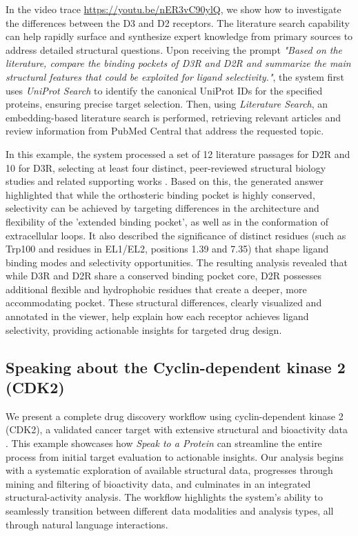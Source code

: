 \documentclass{article}
\begin{document}
In the video trace \url{https://youtu.be/nER3vC90ylQ}, we show how to investigate the differences between the D3 and D2 receptors. The literature search capability can help rapidly surface and synthesize expert knowledge from primary sources to address detailed structural questions.
Upon receiving the prompt \emph{"Based on the literature, compare the binding pockets of D3R and D2R and summarize the main structural features that could be exploited for ligand selectivity."}, the system first uses \emph{UniProt Search} to identify the canonical UniProt IDs for the specified proteins, ensuring precise target selection. Then, using \emph{Literature Search}, an embedding-based literature search is performed, retrieving relevant articles and review information from PubMed Central that address the requested topic. 

In this example, the system processed a set of 12 literature passages for D2R and 10 for D3R, selecting at least four distinct, peer-reviewed structural biology studies and related supporting works \citep{Wang2018,Chien2010,Yin2020,Fan2020}. Based on this, the generated answer highlighted that while the orthosteric binding pocket is highly conserved, selectivity can be achieved by targeting differences in the architecture and flexibility of the 'extended binding pocket', as well as in the conformation of extracellular loops. It also described the significance of distinct residues (such as Trp100 and residues in EL1/EL2, positions 1.39 and 7.35) that shape ligand binding modes and selectivity opportunities. 
The resulting analysis revealed that while D3R and D2R share a conserved binding pocket core, D2R possesses additional flexible and hydrophobic residues that create a deeper, more accommodating pocket. These structural differences, clearly visualized and annotated in the viewer, help explain how each receptor achieves ligand selectivity, providing actionable insights for targeted drug design.



\subsection{Speaking about the Cyclin-dependent kinase 2 (CDK2)}

We present a complete drug discovery workflow using cyclin-dependent kinase 2 (CDK2), a validated cancer target with extensive structural and bioactivity data \citep{Malumbres2009}. This example showcases how \emph{Speak to a Protein} can streamline the entire process from initial target evaluation to actionable insights.
Our analysis begins with a systematic exploration of available structural data, progresses through mining and filtering of bioactivity data, and culminates in an integrated structural-activity analysis. The workflow highlights the system's ability to seamlessly transition between different data modalities and analysis types, all through natural language interactions. 
\end{document}
